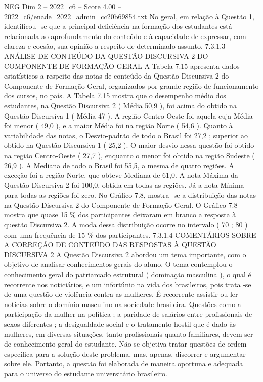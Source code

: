 \begin{textsample}{NEG Dim 2 – 2022\_c6 – Score 4.00 – 2022\_c6/enade\_2022\_admin\_cc20b69854.txt}
No geral, em relação à Questão 1, identificou -se que a principal deficiência na formação dos estudantes está relacionada ao aprofundamento do conteúdo e à capacidade de expressar, com clareza e coesão, sua opinião a respeito de determinado assunto. 7.3.1.3 ANÁLISE DE CONTEÚDO DA QUESTÃO DISCURSIVA 2 DO COMPONENTE DE FORMAÇÃO GERAL A Tabela 7.15 apresenta dados estatísticos a respeito das notas de conteúdo da Questão Discursiva 2 do Componente de Formação Geral, organizados por grande região de funcionamento dos cursos, no país.
A Tabela 7.15 mostra que o desempenho médio dos estudantes, na Questão Discursiva 2 ( Média 50,9 ), foi acima do obtido na Questão Discursiva 1 ( Média 47 ).
A região Centro-Oeste foi aquela cuja Média foi menor ( 49,0 ), e a maior Média foi na região Norte ( 54,6 ).
Quanto à variabilidade das notas, o Desvio-padrão de todo o Brasil foi 27,2 ; superior ao obtido na Questão Discursiva 1 ( 25,2 ).
O maior desvio nessa questão foi obtido na região Centro-Oeste ( 27,7 ), enquanto o menor foi obtido na região Sudeste ( 26,9 ).
A Mediana de todo o Brasil foi 55,5, a mesma de quatro regiões.
A exceção foi a região Norte, que obteve Mediana de 61,0.
A nota Máxima da Questão Discursiva 2 foi 100,0, obtida em todas as regiões.
Já a nota Mínima para todas as regiões foi zero.
No Gráfico 7.8, mostra -se a distribuição das notas na Questão Discursiva 2 do Componente de Formação Geral.
O Gráfico 7.8 mostra que quase 15 \% dos participantes deixaram em branco a resposta à questão Discursiva 2.
A moda dessa distribuição ocorre no intervalo ( 70 ; 80 ) com uma frequência de 15 \% dos participantes. 7.3.1.4 COMENTÁRIOS SOBRE A CORREÇÃO DE CONTEÚDO DAS RESPOSTAS À QUESTÃO DISCURSIVA 2 A Questão Discursiva 2 abordou um tema importante, com o objetivo de analisar conhecimentos gerais do aluno.
O tema contemplou o conhecimento geral do patriarcado estrutural ( dominação masculina ), o qual é recorrente nos noticiários, e um infortúnio na vida dos brasileiros, pois trata -se de uma questão de violência contra as mulheres.
É recorrente assistir ou ler notícias sobre o domínio masculino na sociedade brasileira.
Questões como a participação da mulher na política ; a paridade de salários entre profissionais de sexos diferentes ; a desigualdade social e o tratamento hostil que é dado às mulheres, em diversas situações, tanto profissionais quanto familiares, devem ser de conhecimento geral do estudante.
Não se objetiva tratar questões de ordem específica para a solução deste problema, mas, apenas, discorrer e argumentar sobre ele.
Portanto, a questão foi elaborada de maneira oportuna e adequada para o universo do estudante universitário brasileiro.

\end{textsample}
